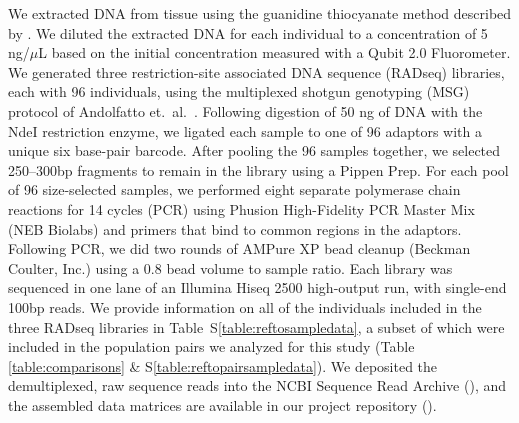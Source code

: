 
\ifembed{

}{}

\ifembed{

}{}


We extracted DNA from tissue using the guanidine thiocyanate method described
by \citet{Esselstyn2008}.
We diluted the extracted DNA for each individual to a concentration of 5
ng/$\mu$L based on the initial concentration measured with a Qubit 2.0
Fluorometer.
We generated three restriction-site associated DNA sequence (RADseq) libraries,
each with 96 individuals, using the multiplexed shotgun genotyping (MSG)
protocol of Andolfatto et.\ al.\ \citep{Andolfatto2011}.
Following digestion of 50 ng of DNA with the NdeI restriction enzyme, we
ligated each sample to one of 96 adaptors with a unique six base-pair barcode.
After pooling the 96 samples together, we selected 250--300bp fragments to
remain in the library using a Pippen Prep.
For each pool of 96 size-selected samples, we performed eight separate
polymerase chain reactions for 14 cycles (PCR) using Phusion High-Fidelity PCR
Master Mix (NEB Biolabs) and primers that bind to common regions in the
adaptors.
Following PCR, we did two rounds of AMPure XP bead cleanup (Beckman Coulter,
Inc.) using a 0.8 bead volume to sample ratio.
Each library was sequenced in one lane of an Illumina Hiseq 2500 high-output
run, with single-end 100bp reads.
We provide information on all of the individuals included in the three RADseq
libraries in Table~S\ref{table:reftosampledata}, a subset of which were
included in the population pairs we analyzed for this study (Table
\ref{table:comparisons} \& S\ref{table:reftopairsampledata}).
We deposited the demultiplexed, raw sequence reads into the NCBI Sequence Read
Archive
(),
and the assembled data matrices are available in our project repository
().


